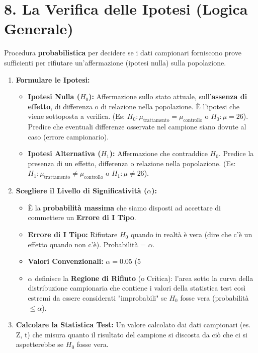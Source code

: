\documentclass[12pt, a4paper]{article}
\newcommand{\popmean}{\mu} %
\newcommand{\alphaerr}{\alpha} %
\newcommand{\Hnull}{H_0} %
\newcommand{\Halt}{H_1} %
\begin{document}
\section*{8. La Verifica delle Ipotesi (Logica Generale)}
Procedura \textbf{probabilistica} per decidere se i dati campionari forniscono prove sufficienti per rifiutare un'affermazione (ipotesi nulla) sulla popolazione.
\begin{enumerate}
    \item \textbf{Formulare le Ipotesi:}
        \begin{itemize}
            \item \textbf{Ipotesi Nulla ($\Hnull$):} Affermazione sullo stato attuale, sull'\textbf{assenza di effetto}, di differenza o di relazione nella popolazione. È l'ipotesi che viene sottoposta a verifica. (Es: $\Hnull: \popmean_{\text{trattamento}} = \popmean_{\text{controllo}}$ o $\Hnull: \popmean = 26$). Predice che eventuali differenze osservate nel campione siano dovute al caso (errore campionario).
            \item \textbf{Ipotesi Alternativa ($\Halt$):} Affermazione che contraddice $\Hnull$. Predice la presenza di un effetto, differenza o relazione nella popolazione. (Es: $\Halt: \popmean_{\text{trattamento}} \neq \popmean_{\text{controllo}}$ o $\Halt: \popmean \neq 26$).
        \end{itemize}
    \item \textbf{Scegliere il Livello di Significatività ($\alphaerr$):}
        \begin{itemize}
            \item È la \textbf{probabilità massima} che siamo disposti ad accettare di commettere un \textbf{Errore di I Tipo}.
            \item \textbf{Errore di I Tipo:} Rifiutare $\Hnull$ quando in realtà è vera (dire che c'è un effetto quando non c'è). Probabilità = $\alphaerr$.
            \item \textbf{Valori Convenzionali:} $\alphaerr = 0.05$ (5%
            \item $\alphaerr$ definisce la \textbf{Regione di Rifiuto} (o Critica): l'area sotto la curva della distribuzione campionaria che contiene i valori della statistica test così estremi da essere considerati "improbabili" se $\Hnull$ fosse vera (probabilità $\le \alphaerr$).
        \end{itemize}
    \item \textbf{Calcolare la Statistica Test:} Un valore calcolato dai dati campionari (es. Z, t) che misura quanto il risultato del campione si discosta da ciò che ci si aspetterebbe se $\Hnull$ fosse vera.

\end{enumerate}
\end{document}
